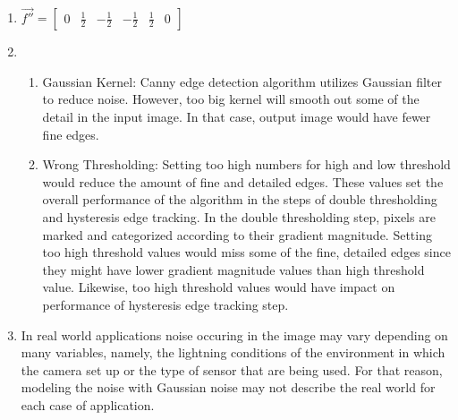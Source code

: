 \documentclass{article}
\begin{document}
\begin{enumerate}
	\item $ \vec{f''} = \begin{bmatrix}  0 & \frac{1}{2} & - \frac{1}{2} &
	-\frac{1}{2} & \frac{1}{2} & 0 \end{bmatrix}$
	\item %
	\begin{enumerate}
		\item Gaussian Kernel: Canny edge detection algorithm utilizes Gaussian
		filter to reduce noise. However, too big kernel will smooth out some of the
		detail in the input image. In that case, output image would have fewer fine
		edges.
		\item Wrong Thresholding: Setting too high numbers for high and low threshold
		would reduce the amount of fine and detailed edges. These values set the
		overall performance of the algorithm in the steps of double thresholding and
		hysteresis edge tracking. 
		In the double thresholding step, pixels are marked and categorized according
		to their gradient magnitude. Setting too high threshold values would miss some
		of the fine, detailed edges since they might have lower gradient magnitude
		values than high threshold value. Likewise, too high threshold
		values would have impact on performance of hysteresis edge tracking step.
	\end{enumerate}
	\item In real world applications noise occuring in the image may vary
	depending on many variables, namely, the lightning conditions of the
	environment in which the camera set up or the type of sensor that are being
	used. For that reason, modeling the noise with Gaussian noise may not describe
	the real world for each case of application. 

\end{enumerate}
\end{document}
